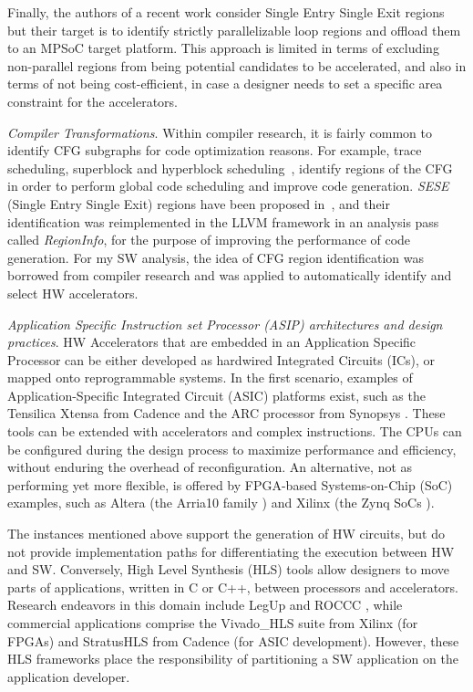 \documentclass[]{usiinfthesis}
\begin{document}
Finally, the authors of a recent work \cite{AguilarJune16} consider
Single Entry Single Exit regions but their target is to identify
strictly parallelizable loop regions and offload them to an MPSoC
target platform. This approach is limited in
terms of excluding non-parallel regions from being potential
candidates to be accelerated, and also in terms of not being cost-efficient, in case a
designer needs to set a specific area constraint for the accelerators.

\emph{Compiler Transformations}.
Within compiler research, it is fairly 
common to identify CFG subgraphs for code
optimization reasons. For example, trace scheduling, superblock and
hyperblock scheduling~\cite{HankSep93}, identify regions
of the CFG in order to perform global code scheduling and
improve code generation. \emph{SESE} (Single Entry
Single Exit) regions have been proposed in~\cite{JohnsonJun94}, and
their identification was reimplemented in the LLVM framework in an 
analysis pass
called \emph{RegionInfo}, for the purpose of improving the
performance of code generation. For my SW analysis, the idea of
CFG region identification was borrowed from compiler research and was 
applied to automatically identify and select HW accelerators.

\emph{Application Specific Instruction set Processor (ASIP) architectures and design practices}.
HW Accelerators that are embedded
in an Application Specific Processor can be either developed as hardwired
Integrated Circuits (ICs), or mapped onto reprogrammable systems. In the
first scenario, examples of Application-Specific Integrated Circuit (ASIC) 
platforms exist, such as the
Tensilica Xtensa from Cadence \cite{TensilicaMar17} and the ARC
processor from Synopsys \cite{ArcDec16}. These tools can be extended with
accelerators and complex instructions. The CPUs can be configured
during the design process to maximize performance and efficiency,
without enduring the overhead of reconfiguration. An alternative, not 
as performing yet more flexible, is offered by FPGA-based
Systems-on-Chip (SoC) examples, such as Altera (the Arria10 family \cite{ArriaNov16}) and
Xilinx (the Zynq SoCs \cite{ZynqMar17}).\par

The instances mentioned above support the generation of HW
circuits, but do not provide implementation paths for differentiating the
execution between HW and SW. Conversely, High Level
Synthesis (HLS) tools allow designers to move parts of applications, 
written in C or C++, between processors and
accelerators. Research endeavors in this domain include LegUp
\cite{CanisSep13} and ROCCC \cite{GuoMar05}, while commercial
applications comprise the Vivado\_HLS \cite{VivadoHLSMar17} suite
from Xilinx (for FPGAs) and StratusHLS \cite{StratusHLSApr16} from
Cadence (for ASIC development).
However, these HLS frameworks place the responsibility of
partitioning a SW application on the application developer.\par
\end{document}
